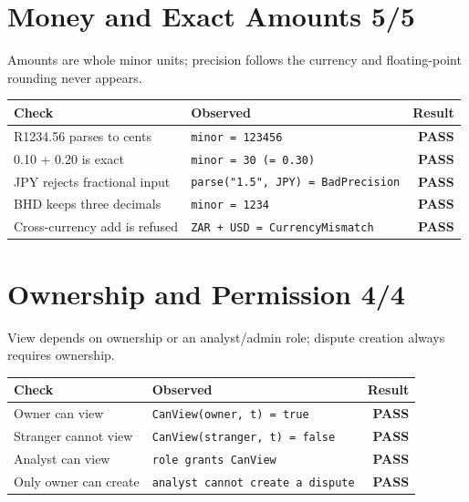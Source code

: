 \documentclass[11pt,a4paper]{article}
\newcommand{\pass}{\textcolor{PassGreen}{\textbf{PASS}}}
\begin{document}
\section*{Money and Exact Amounts \hfill \normalsize\textcolor{ADGBlue}{5/5}}
\noindent Amounts are whole minor units; precision follows the currency and floating-point rounding never appears.\par\vspace{0.4em}
\renewcommand{\arraystretch}{1.25}
\begin{longtable}{@{}p{}p{}r@{}}
\toprule
\textbf{Check} & \textbf{Observed} & \textbf{Result} \\
\midrule
\endhead
R1234.56 parses to cents & \texttt{\small minor = 123456} & \pass \\
0.10 + 0.20 is exact & \texttt{\small minor = 30 (= 0.30)} & \pass \\
JPY rejects fractional input & \texttt{\small parse("1.5", JPY) = BadPrecision} & \pass \\
BHD keeps three decimals & \texttt{\small minor = 1234} & \pass \\
Cross-currency add is refused & \texttt{\small ZAR + USD = CurrencyMismatch} & \pass \\
\bottomrule
\end{longtable}

\section*{Ownership and Permission \hfill \normalsize\textcolor{ADGBlue}{4/4}}
\noindent View depends on ownership or an analyst/admin role; dispute creation always requires ownership.\par\vspace{0.4em}
\renewcommand{\arraystretch}{1.25}
\begin{longtable}{@{}p{}p{}r@{}}
\toprule
\textbf{Check} & \textbf{Observed} & \textbf{Result} \\
\midrule
\endhead
Owner can view & \texttt{\small CanView(owner, t) = true} & \pass \\
Stranger cannot view & \texttt{\small CanView(stranger, t) = false} & \pass \\
Analyst can view & \texttt{\small role grants CanView} & \pass \\
Only owner can create & \texttt{\small analyst cannot create a dispute} & \pass \\
\bottomrule
\end{longtable}
\end{document}

